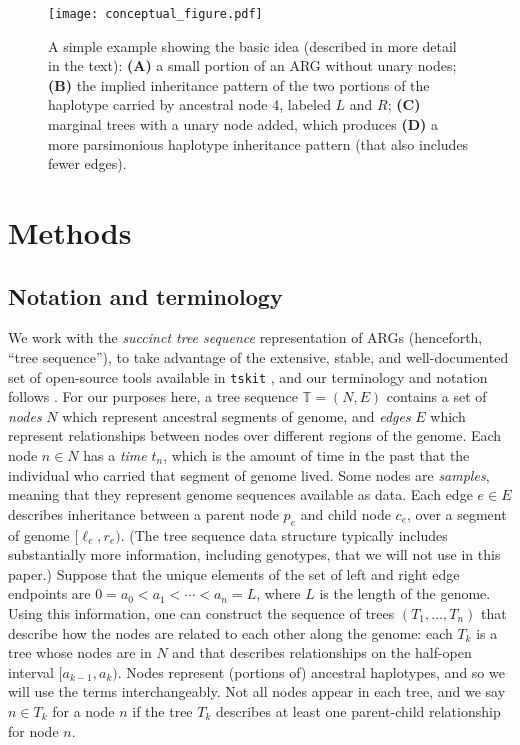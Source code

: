 \documentclass[10pt,twoside,lineno]{gsajnl}
\newcommand{\T}{\mathbb{T}}
\newcommand{\tskit}{\texttt{tskit}}
\begin{document}
\begin{figure}
    \begin{center}
    \texttt{[image: conceptual\_figure.pdf]}
    \end{center}
    \caption{
        A simple example showing the basic idea
        (described in more detail in the text):
        \textbf{(A)} a small portion of an ARG without unary nodes;
        \textbf{(B)} the implied inheritance pattern of the two portions of the haplotype carried by ancestral node 4,
        labeled $L$ and $R$;
        \textbf{(C)} marginal trees with a unary node added,
        which produces \textbf{(D)} a more parsimonious haplotype inheritance pattern
        (that also includes fewer edges).
        \label{fig:conceptual}
    }
\end{figure}

\section{Methods}

\subsection{Notation and terminology}

We work with the \emph{succinct tree sequence} representation of ARGs (henceforth, ``tree sequence''),
to take advantage of the extensive, stable, and well-documented set of open-source tools
available in \tskit{} \citep{tskit}, 
and our terminology and notation follows \citet{ralph2020efficiently}.
For our purposes here,
a tree sequence $\T = (N, E)$ contains a set of \emph{nodes} $N$ 
which represent ancestral segments of genome,
and \emph{edges} $E$ which represent relationships between nodes over different regions of the genome.
Each node $n \in N$ has a \emph{time} $t_n$,
which is the amount of time in the past that the individual who carried that segment of genome lived.
Some nodes are \emph{samples}, meaning that they represent genome sequences available as data.
Each edge $e \in E$ describes inheritance between a parent node $p_e$ and child node $c_e$,
over a segment of genome $[\ell_e, r_e)$.
(The tree sequence data structure typically includes substantially more information, including genotypes, that we will not use in this paper.)
Suppose that the unique elements of the set of left and right edge endpoints
are $0 = a_0 < a_1 < \cdots < a_{n} = L$, where $L$ is the length of the genome.
Using this information, one can construct the sequence of 
trees $\left(T_1,...,T_{n}\right)$ that describe how the nodes are related to each other along the genome:
each $T_k$ is a tree whose nodes are in $N$
and that describes relationships on the half-open interval $[a_{k-1}, a_k)$.
Nodes represent (portions of) ancestral haplotypes, and so
we will use the terms interchangeably.
Not all nodes appear in each tree,
and we say $n \in T_k$ for a node $n$ if the tree $T_k$ describes at least one parent-child relationship
for node $n$.
\end{document}
